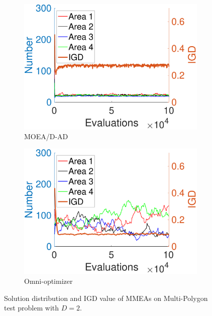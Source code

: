 \documentclass[conference]{IEEEtran}
\begin{document}
\begin{figure}[htbp]
    \begin{subfigure}[b]{.22\textwidth}
    \includegraphics[width=\linewidth]{Section5/dim2/Diversity/MOEADAD}
    \caption{MOEA/D-AD}
    \end{subfigure}
    \begin{subfigure}[b]{.22\textwidth}
    \includegraphics[width=\linewidth]{Section5/dim2/Diversity/OmniOptimizer}
    \caption{Omni-optimizer}
    \end{subfigure}
    \caption{Solution distribution and IGD value of MMEAs on Multi-Polygon test problem with $D=2$.}
    \label{fig: MMEAs Diversity dim=2}
\end{figure}
\end{document}

